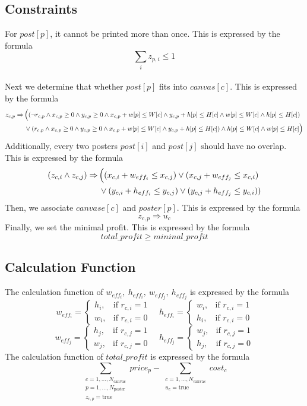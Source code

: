 \documentclass{article}
\begin{document}
\subsection{Constraints}
For $post[p]$, it cannot be printed more than once. This is expressed by the formula
\[
\sum_i z_{p,i} \leq 1
\]
\\Next we determine that whether $post[p]$ fits into $canvas[c]$. This is expressed by the formula 
\begin{align*}
z_{c,p} \Rightarrow \, 
& \Bigl( (\lnot r_{c,p} \wedge x_{c,p} \ge 0 \wedge y_{c,p} \ge 0 \wedge x_{c,p} + w[p] \le W[c] \wedge y_{c,p} + h[p] \le H[c] \wedge w[p] \le W[c] \wedge h[p] \le H[c]) \nonumber\\
& \vee ( r_{c,p} \wedge x_{c,p} \ge 0 \wedge y_{c,p} \ge 0 \wedge x_{c,p} + w[p] \le W[c] \wedge y_{c,p} + h[p] \le H[c]) \wedge h[p] \le W[c] \wedge w[p] \le H[c] \Bigr)
\end{align*}
Additionally, every two posters $post[i]$ and $post[j]$ should have no overlap. This is expressed by the formula
\begin{align*}
(z_{c,i} \wedge z_{c,j}) \Rightarrow \, 
& \Bigl( (x_{c,i} + w_{eff_i} \le x_{c,j} ) \vee (x_{c,j} + w_{eff_j} \le x_{c,i} ) \nonumber\\
& \vee(y_{c,i} + h_{eff_i} \le y_{c,j} ) \vee (y_{c,j} + h_{eff_j} \le y_{c,i} ))
\end{align*}
Then, we associate $canvase[c]$ and $poster[p]$. This is expressed by the formula
\[
z_{c,p} \Rightarrow u_c
\]
Finally, we set the minimal profit. This is expressed by the formula
\[
total\_profit \ge mininal\_profit
\]

\subsection{Calculation Function}
The calculation function of $w_{eff_i}, \ h_{eff_i}, \ w_{eff_j}, \ h_{eff_j}$ is expressed by the formula
\[
w_{eff_i} =
\begin{cases}
h_i, & \text{if } r_{c,i} = 1 \\[4pt]
w_i, & \text{if } r_{c,i} = 0
\end{cases}
\quad h_{eff_i} =
\begin{cases}
w_i, & \text{if } r_{c,i} = 1 \\[4pt]
h_i, & \text{if } r_{c,i} = 0
\end{cases}
\]
\[
w_{eff_j} =
\begin{cases}
h_j, & \text{if } r_{c,j} = 1 \\[4pt]
w_j, & \text{if } r_{c,j} = 0
\end{cases}
\quad h_{eff_j} =
\begin{cases}
w_j, & \text{if } r_{c,j} = 1 \\[4pt]
h_j, & \text{if } r_{c,j} = 0
\end{cases}
\]
The calculation function of $total\_profit$ is expressed by the formula
\[
\sum_{\substack{c=1,\dots,N_{\text{canvas}} \\ p=1,\dots,N_{\text{poster}} \\ z_{c,p} = \text{true}}} price_p - \sum_{\substack{c=1,\dots,N_{\text{canvas}} \\ u_c = \text{true}}} cost_c
\]
\end{document}
